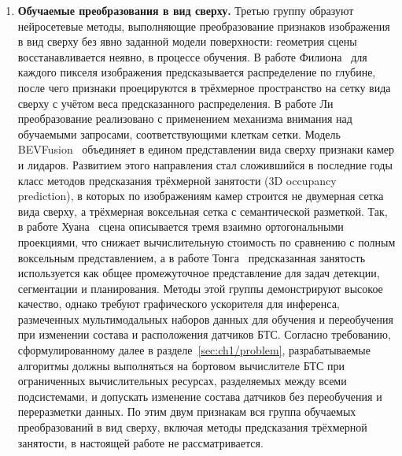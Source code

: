 \begin{enumerate}
    \item \textbf{Обучаемые преобразования в вид сверху.} Третью группу образуют нейросетевые методы, выполняющие преобразование признаков изображения в вид сверху без явно заданной модели поверхности: геометрия сцены восстанавливается неявно, в процессе обучения. В работе Филиона~\cite{philion2020lift} для каждого пикселя изображения предсказывается распределение по глубине, после чего признаки проецируются в трёхмерное пространство на сетку вида сверху с учётом веса предсказанного распределения. В работе Ли~\cite{li2022bevformer} преобразование реализовано с применением механизма внимания над обучаемыми запросами, соответствующими клеткам сетки. Модель BEVFusion~\cite{liu2023bevfusion, liu2024bevfusionmultitaskmultisensorfusion} объединяет в едином представлении вида сверху признаки камер и лидаров. Развитием этого направления стал сложившийся в последние годы класс методов предсказания трёхмерной занятости (3D occupancy prediction), в которых по изображениям камер строится не двумерная сетка вида сверху, а трёхмерная воксельная сетка с семантической разметкой. Так, в работе Хуана~\cite{huang2023tpvformer} сцена описывается тремя взаимно ортогональными проекциями, что снижает вычислительную стоимость по сравнению с полным воксельным представлением, а в работе Тонга~\cite{tong2023occnet} предсказанная занятость используется как общее промежуточное представление для задач детекции, сегментации и планирования. Методы этой группы демонстрируют высокое качество, однако требуют графического ускорителя для инференса, размеченных мультимодальных наборов данных для обучения и переобучения при изменении состава и расположения датчиков БТС. Согласно требованию, сформулированному далее в разделе~\cref{sec:ch1/problem}, разрабатываемые алгоритмы должны выполняться на бортовом вычислителе БТС при ограниченных вычислительных ресурсах, разделяемых между всеми подсистемами, и допускать изменение состава датчиков без переобучения и переразметки данных. По этим двум признакам вся группа обучаемых преобразований в вид сверху, включая методы предсказания трёхмерной занятости, в настоящей работе не рассматривается.
\end{enumerate}

